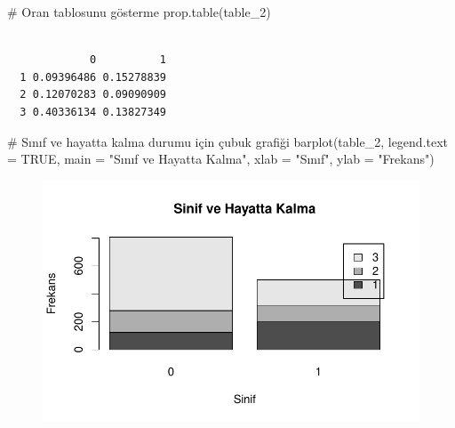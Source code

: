 \documentclass[
  letterpaper,
  DIV=11,
  numbers=noendperiod]{scrartcl}
\newenvironment{Shaded}{\begin{snugshade}}{\end{snugshade}}
\newcommand{\AttributeTok}[1]{\textcolor[rgb]{0.40,0.45,0.13}{#1}}
\newcommand{\CommentTok}[1]{\textcolor[rgb]{0.37,0.37,0.37}{#1}}
\newcommand{\ConstantTok}[1]{\textcolor[rgb]{0.56,0.35,0.01}{#1}}
\newcommand{\FunctionTok}[1]{\textcolor[rgb]{0.28,0.35,0.67}{#1}}
\newcommand{\NormalTok}[1]{\textcolor[rgb]{0.00,0.23,0.31}{#1}}
\newcommand{\OtherTok}[1]{\textcolor[rgb]{0.00,0.23,0.31}{#1}}
\newcommand{\SpecialCharTok}[1]{\textcolor[rgb]{0.37,0.37,0.37}{#1}}
\newcommand{\StringTok}[1]{\textcolor[rgb]{0.13,0.47,0.30}{#1}}
\begin{document}
\begin{Shaded}
\begin{Highlighting}[]
\CommentTok{\# Oran tablosunu gösterme}
\FunctionTok{prop.table}\NormalTok{(table\_2)}
\end{Highlighting}
\end{Shaded}

\begin{verbatim}
   
             0          1
  1 0.09396486 0.15278839
  2 0.12070283 0.09090909
  3 0.40336134 0.13827349
\end{verbatim}

\begin{Shaded}
\begin{Highlighting}[]
\CommentTok{\# Sınıf ve hayatta kalma durumu için çubuk grafiği}
\FunctionTok{barplot}\NormalTok{(table\_2, }\AttributeTok{legend.text =} \ConstantTok{TRUE}\NormalTok{, }\AttributeTok{main =} \StringTok{"Sınıf ve Hayatta Kalma"}\NormalTok{, }\AttributeTok{xlab =} \StringTok{"Sınıf"}\NormalTok{, }\AttributeTok{ylab =} \StringTok{"Frekans"}\NormalTok{)}
\end{Highlighting}
\end{Shaded}

\begin{figure}[H]

{\centering \includegraphics{4_hafta_tanimlayici_istatistik_files/figure-pdf/unnamed-chunk-6-4.pdf}

}

\end{figure}

\begin{Shaded}
\end{Shaded}
\end{document}
